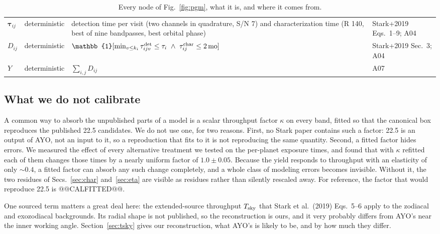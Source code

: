 \documentclass[11pt,a4paper]{article}
\begin{document}
\begin{table}[htbp]
\begin{tabular}{p{1.2cm}p{3.2cm}p{5.6cm}p{3.6cm}}
$\boldsymbol{\tau}_{ij}$ & deterministic & detection time per visit (two channels in quadrature, S/N 7) and characterization time (R 140, best of nine bandpasses, best orbital phase) & Stark+2019 Eqs.~1--9; A04 \\
$D_{ij}$ & deterministic & $\mathbb{1}[\min_{v \le k_i}\tau^{\rm det}_{ijv} \le \tau_i \ \wedge\ \tau^{\rm char}_{ij} \le 2\,\mathrm{mo}]$ & Stark+2019 Sec.~3; A04 \\
$Y$ & deterministic & $\sum_{i,j} D_{ij}$ & A07 \\
\bottomrule
\end{tabular}
\caption{Every node of Fig.~\ref{fig:pgm}, what it is, and where it comes from.}
\label{tab:nodes}
\end{table}

\subsection{What we do not calibrate}
\label{sec:kappa}

A common way to absorb the unpublished parts of a model is a scalar throughput factor $\kappa$
on every band, fitted so that the canonical box reproduces the published 22.5 candidates. We do
not use one, for two reasons. First, no Stark paper contains such a factor: 22.5 is an output of
AYO, not an input to it, so a reproduction that fits to it is not reproducing the same quantity.
Second, a fitted factor hides errors. We measured the effect of every alternative treatment we
tested on the per-planet exposure times, and found that with $\kappa$ refitted each of them
changes those times by a nearly uniform factor of $1.0 \pm 0.05$. Because the yield responds to
throughput with an elasticity of only $\sim0.4$, a fitted factor can absorb any such change
completely, and a whole class of modeling errors becomes invisible. Without it, the two residues of
Secs.~\ref{sec:char} and~\ref{sec:eta} are visible as residues rather than silently rescaled
away. For reference, the factor that would reproduce 22.5 is @@CALFITTED@@.

One sourced term matters a great deal here: the extended-source throughput $T_{\rm sky}$ that
Stark et al.\ (2019) Eqs.~5--6 apply to the zodiacal and exozodiacal backgrounds. Its radial
shape is not published, so the reconstruction is ours, and it very probably differs from AYO's
near the inner working angle. Section~\ref{sec:tsky} gives our reconstruction, what AYO's is
likely to be, and by how much they differ.

\end{document}
